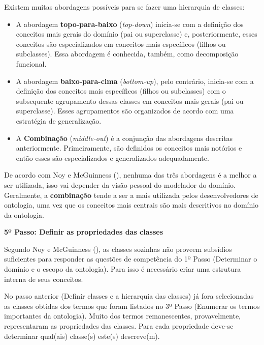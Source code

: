   Existem muitas abordagens possíveis para se fazer uma hierarquia de classes: \cite{breitman05}
  
  \begin{itemize}
   \item A abordagem \textbf{topo-para-baixo} (\textit{top-down}) inicia-se com a definição dos conceitos mais gerais do domínio (pai ou superclasse) 
   e, posteriormente, esses conceitos são especializados em conceitos mais específicos (filhos ou subclasses). Essa abordagem é 
   conhecida, também, como decomposição funcional. 
   \item A abordagem \textbf{baixo-para-cima} (\textit{bottom-up}), pelo contrário, inicia-se com a definição dos conceitos mais específicos 
   (filhos ou subclasses) com o subsequente agrupamento dessas classes em conceitos mais gerais (pai ou superclasse). Esses
   agrupamentos são organizados de acordo com uma estratégia de generalização. \cite{noy15}
   \item A \textbf{Combinação} (\textit{middle-out}) é a conjunção das abordagens descritas anteriormente. Primeiramente, são definidos
   os conceitos mais notórios e então esses são especializados e generalizados adequadamente. \cite{noy15}
  \end{itemize}
  
  De acordo com Noy e McGuinness (\citeyear{noy15}), nenhuma das três abordagens é a melhor a ser utilizada, isso vai depender da visão
  pessoal do modelador do domínio. Geralmente, a \textbf{combinação} tende a ser a mais utilizada pelos desenvolvedores de ontologia,
  uma vez que os conceitos mais centrais são mais descritivos no domínio da ontologia. \cite{noy15}
  
\vspace{0.5cm}  
  
{\raggedright  
  \textbf{5º Passo: Definir as propriedades das classes}
}
  
  Segundo Noy e McGuinness (\citeyear{noy15}), as classes sozinhas não proveem subsídios suficientes para responder as questões de competência
  do 1º Passo (Determinar o domínio e o escopo da ontologia). Para isso é necessário criar uma estrutura interna de seus conceitos.
  
  No passo anterior (Definir classes e a hierarquia das classes) já fora selecionadas as classes obtidas dos termos que foram listados
  no 3º Passo (Enumerar os termos importantes da ontologia).  Muito dos termos remanescentes, provavelmente, representaram as
  propriedades das classes. Para cada propriedade deve-se determinar qual(ais) classe(s) este(s) descreve(m). \cite{noy15}
  
